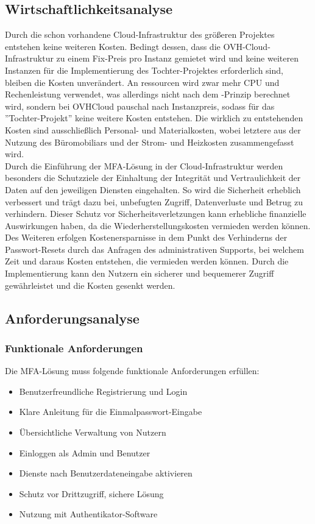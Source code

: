 \subsection{Wirtschaftlichkeitsanalyse}
\label{sec:Wirtschaftlichkeitsanalyse}
Durch die schon vorhandene Cloud-Infrastruktur des größeren Projektes entstehen keine weiteren Kosten. Bedingt dessen, dass die 
OVH-Cloud-Infrastruktur zu einem Fix-Preis pro Instanz gemietet wird und keine weiteren Instanzen für die Implementierung 
des Tochter-Projektes erforderlich sind, bleiben die Kosten unverändert. 
An ressourcen wird zwar mehr CPU und Rechenleistung verwendet, was allerdings nicht nach dem \cite{Wiki}-Prinzip 
berechnet wird, sondern bei OVHCloud pauschal nach Instanzpreis, sodass für das ''Tochter-Projekt'' keine weitere 
Kosten entstehen. Die wirklich zu entstehenden Kosten sind ausschließlich Personal- und Materialkosten, wobei letztere 
aus der Nutzung des Büromobiliars und der Strom- und Heizkosten zusammengefasst wird. 
\\Durch die Einführung der \acs{MFA}-Lösung in der Cloud-Infrastruktur werden besonders die Schutzziele der 
Einhaltung der Integrität und Vertraulichkeit der Daten auf den jeweiligen Diensten eingehalten. So wird die Sicherheit 
erheblich verbessert und trägt dazu bei, unbefugten Zugriff, Datenverluste und Betrug zu verhindern. Dieser Schutz 
vor Sicherheitsverletzungen kann erhebliche finanzielle Auswirkungen haben, da die Wiederherstellungskosten vermieden 
werden können. Des Weiteren erfolgen Kostenersparnisse in dem Punkt des Verhinderns der Passwort-Resets durch das Anfragen des 
administrativen Supports, bei welchem Zeit und daraus Kosten entstehen, die vermieden werden können. Durch die Implementierung 
kann den Nutzern ein sicherer und bequemerer Zugriff gewährleistet und die Kosten gesenkt werden.


\subsection{Anforderungsanalyse}
\label{sec:Anforderungsanalyse}

\subsubsection{Funktionale Anforderungen}
\label{sec:Funktional}
Die MFA-Lösung muss folgende funktionale Anforderungen erfüllen:
\begin{itemize} [label=--]
	\item Benutzerfreundliche Registrierung und Login
	\item Klare Anleitung für die Einmalpasswort-Eingabe
	\item Übersichtliche Verwaltung von Nutzern
	\item Einloggen als Admin und Benutzer
	\item Dienste nach Benutzerdateneingabe aktivieren
	\item Schutz vor Drittzugriff, sichere Lösung
	\item Nutzung mit Authentikator-Software
\end{itemize}

